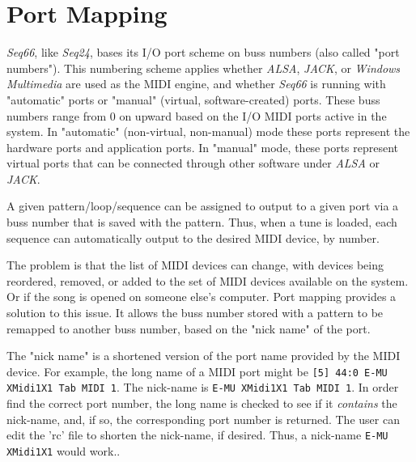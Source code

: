 %
%
%

\section{Port Mapping}
\label{sec:port_mapping}

   \textsl{Seq66}, like \textsl{Seq24}, bases its I/O port scheme on buss
   numbers (also called "port numbers").  This numbering scheme applies whether
   \textsl{ALSA}, \textsl{JACK}, or \textsl{Windows Multimedia}
   are used as the MIDI engine, and whether \textsl{Seq66} is running with
   "automatic" ports or "manual" (virtual, software-created) ports.
   These buss numbers range from 0 on upward
   based on the I/O MIDI ports active in the system.
   In "automatic" (non-virtual, non-manual) mode
   these ports represent the hardware ports and application ports.
   In "manual" mode, these ports represent virtual ports
   that can be connected through other software under \textsl{ALSA} or
   \textsl{JACK}.

   A given pattern/loop/sequence can be assigned to output to a given port via
   a buss number that is saved with the pattern.  Thus, when a tune is loaded,
   each sequence can automatically output to the desired MIDI device, by number.

   The problem is that the list of MIDI devices can change, with devices being
   reordered, removed, or added to the set of MIDI devices available on the
   system.  Or if the song is opened on someone else's computer.
   Port mapping provides a solution to this issue.  It allows
   the buss number stored with a pattern to be remapped to another buss number,
   based on the "nick name" of the port.

   The "nick name" is a shortened version of the port name provided by the MIDI
   device. For example, the long name of a MIDI port might be
   \texttt{[5] 44:0 E-MU XMidi1X1 Tab MIDI 1}.
   The nick-name is \texttt{E-MU XMidi1X1 Tab MIDI 1}.
   In order find the correct port number, the long name is checked to see if it
   \textsl{contains} the nick-name, and, if so, the corresponding port number is
   returned.  The user can edit the 'rc' file to shorten the nick-name, if
   desired.
   Thus, a nick-name \texttt{E-MU XMidi1X1} would work..

